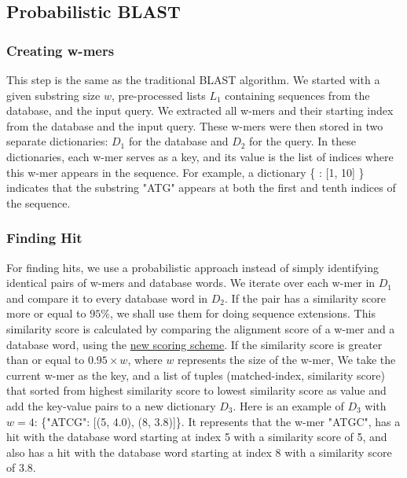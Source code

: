 \documentclass{article}
\begin{document}
\subsection*{Probabilistic BLAST}
\subsubsection*{Creating w-mers}
This step is the same as the traditional BLAST algorithm. We started with a given substring size \( w \), pre-processed lists \( L_1 \) containing sequences from the database, and the input query. We extracted all w-mers and their starting index from the database and the input query. These w-mers were then stored in two separate dictionaries: \( D_1 \) for the database and \( D_2 \) for the query. In these dictionaries, each w-mer serves as a key, and its value is the list of indices where this w-mer appears in the sequence. For example, a dictionary \{ : [1, 10] \} indicates that the substring "ATG" appears at both the first and tenth indices of the sequence.\\
\subsubsection*{Finding Hit}
For finding hits, we use a probabilistic approach instead of simply identifying identical pairs of w-mers and database words. We iterate over each w-mer in \(D_1\) and compare it to every database word in \(D_2\). If the pair has a similarity score more or equal to $95\%$, we shall use them for doing sequence extensions. This similarity score is calculated by comparing the alignment score of a w-mer and a database word, using the \hyperref[sec:scoring]{new scoring scheme}. If the similarity score is greater than or equal to \(0.95 \times w\), where \(w\) represents the size of the w-mer, We take the current w-mer as the key, and a list of tuples (matched-index, similarity score) that sorted from highest similarity score to lowest similarity score as value and add the key-value pairs to a new dictionary \(D_3\).
Here is an example of $D_3$ with $w=4$: \{"ATCG": [(5, 4.0), (8, 3.8)]\}. It represents that the w-mer "ATGC", has a hit with the database word starting at index 5 with a similarity score of 5, and also has a hit with the database word starting at index 8 with a similarity score of 3.8. \\
\end{document}

